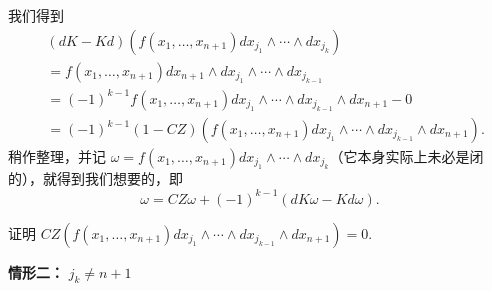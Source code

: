 我们得到
\[
\begin{aligned}
&(dK-Kd)\left(f(x_1,\ldots,x_{n+1})dx_{j_1}\wedge\cdots\wedge dx_{j_k}\right)\\
&= f(x_1,\ldots,x_{n+1})dx_{n+1}\wedge dx_{j_1}\wedge\cdots\wedge dx_{j_{k-1}}\\
&= (-1)^{k-1}f(x_1,\ldots,x_{n+1})dx_{j_1}\wedge\cdots\wedge dx_{j_{k-1}}\wedge dx_{n+1}-0\\
&= (-1)^{k-1}\left(1-CZ\right)\left(f(x_1,\ldots,x_{n+1})dx_{j_1}\wedge\cdots\wedge dx_{j_{k-1}}\wedge dx_{n+1}\right).
\end{aligned}
\]
稍作整理，并记 $\omega=f(x_1,\ldots,x_{n+1})dx_{j_1}\wedge\cdots\wedge dx_{j_k}$（它本身实际上未必是闭的），就得到我们想要的，即
\[
\omega=CZ\omega+(-1)^{k-1}\left(dK\omega-Kd\omega\right).
\]

\begin{question}\label{q:8-7}
证明 $CZ\left(f(x_1,\ldots,x_{n+1})dx_{j_1}\wedge\cdots\wedge dx_{j_{k-1}}\wedge dx_{n+1}\right)=0$.
\end{question}

\textbf{情形二：} $j_k\neq n+1$

